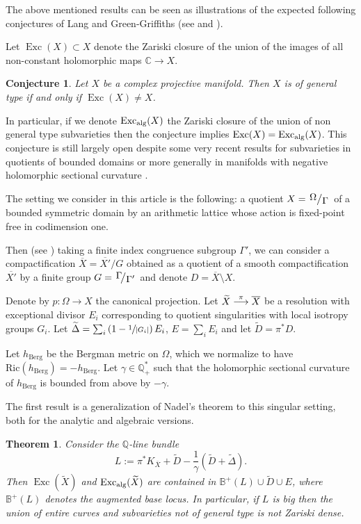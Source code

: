 \documentclass[10pt]{amsart}
\def\To#1{\mathchoice{\xrightarrow{\textstyle\kern4pt#1\kern3pt}}{\stackrel{#1}{\longrightarrow}}{}{}}
\theoremstyle{plain}
\newtheorem{thma}{Theorem}
\newtheorem{conjecture}[theorem]{Conjecture}
\theoremstyle{definition}
\numberwithin{equation}{theorem}
\DeclareMathOperator{\Exc}{Exc}
\newcommand\CC{\mathbb C}
\newcommand{\quotient}[2]{{\left.\raisebox{.2em}{$#1$}\middle/\raisebox{-.2em}{$#2$}\right.}}
\newcommand{\abs}[1]{ {\left| #1 \right| } }
\begin{document}
The above mentioned results can be seen as illustrations of the expected following conjectures of Lang and Green-Griffiths (see \cite{Lan86} and \cite{GG80}).

Let $\Exc(X) \subset X$ denote the Zariski closure of the union of the images of all non-constant holomorphic maps $\CC \to X$.

\begin{conjecture}\label{Lang}
Let $X$ be a complex projective manifold. Then $X$ is of general type if and only if $\Exc(X) \neq X$.
\end{conjecture}

In particular, if we denote $\Exc_{\textup{alg}}(X)$ the Zariski closure of the union of non general type subvarieties then the conjecture implies $\Exc(X)=\Exc_{\textup{alg}}(X)$.
This conjecture is still largely open despite some very recent results for subvarieties in quotients of bounded domains \cite{BD18} or more generally in manifolds with negative holomorphic sectional curvature \cite{G18}.

The setting we consider in this article is the following: a quotient $X = \quotient{\Omega}{\Gamma}$ of a bounded symmetric domain by an arithmetic lattice whose action is fixed-point free in codimension one.

Then (see \cite{mum2}) taking a finite index congruence subgroup $\Gamma'$, we can consider a compactification $\overline{X}=\overline{X'}/G$ obtained as a quotient of a smooth compactification~$\overline{X'}$ by a finite group $G = \quotient{\Gamma\!}{\Gamma'}$ and denote $D = \overline{X} \setminus X$.

Denote by $p : \Omega \to X$ the canonical projection. Let $\widetilde{X} \To{\pi} \overline{X}$ be a resolution with exceptional divisor $E_i$ corresponding to quotient singularities with local isotropy groups $G_i$. Let $\widetilde{\Delta} = \sum_i \left(1 - \sfrac{1}{\abs{G_i}} \right) E_i$, $E = \sum_i E_i$ and let $\widetilde{D} = \pi^\ast D$.

Let $h_{\mathrm{Berg}}$ be the Bergman metric on $\Omega$, which we normalize to have $\mathrm{Ric}(h_{\mathrm{Berg}}) = -h_{\mathrm{Berg}}$. Let $\gamma \in \mathbb Q_+^\ast$ such that the holomorphic sectional curvature of $h_{\mathrm{Berg}}$ is bounded from above by $- \gamma$.

The first result is a generalization of Nadel's theorem \cite{Na89} to this singular setting, both for the analytic and algebraic versions.


\begin{thma}\label{th:A} Consider the $\mathbb Q$-line bundle
$$
L := \pi^\ast K_{\overline{X}} + \widetilde{D} - \frac{1}{\gamma}( \widetilde{D} + \widetilde{\Delta}).
$$
Then $\Exc(\widetilde{X})$ and $\Exc_{\textup{alg}}(\widetilde{X})$ are contained in $\mathbb B^+(L) \cup \widetilde{D} \cup E$, where $\mathbb{B}^+(L)$ denotes the augmented base locus.
In particular, if $L$ is big then the union of entire curves and subvarieties not of general type is not Zariski dense.
\end{thma}
\end{document}
